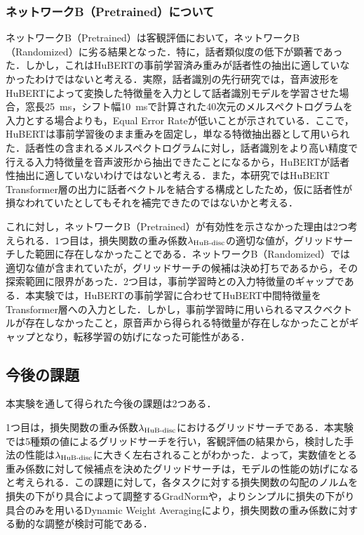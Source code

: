 \subsubsection{ネットワークB（Pretrained）について}
ネットワークB（Pretrained）は客観評価において，ネットワークB（Randomized）に劣る結果となった．特に，話者類似度の低下が顕著であった．しかし，これはHuBERTの事前学習済み重みが話者性の抽出に適していなかったわけではないと考える．実際，話者識別の先行研究\cite{chen2022large}では，音声波形をHuBERTによって変換した特徴量を入力として話者識別モデルを学習させた場合，窓長\SI{25}{\ms}，シフト幅\SI{10}{\ms}で計算された40次元のメルスペクトログラムを入力とする場合よりも，Equal Error Rateが低いことが示されている．ここで，HuBERTは事前学習後のまま重みを固定し，単なる特徴抽出器として用いられた．話者性の含まれるメルスペクトログラムに対し，話者識別をより高い精度で行える入力特徴量を音声波形から抽出できたことになるから，HuBERTが話者性抽出に適していないわけではないと考える．また，本研究ではHuBERT Transformer層の出力に話者ベクトルを結合する構成としたため，仮に話者性が損なわれていたとしてもそれを補完できたのではないかと考える．

これに対し，ネットワークB（Pretrained）が有効性を示さなかった理由は2つ考えられる．1つ目は，損失関数の重み係数$\lambda_{\text{HuB-disc}}$の適切な値が，グリッドサーチした範囲に存在しなかったことである．ネットワークB（Randomized）では適切な値が含まれていたが，グリッドサーチの候補は決め打ちであるから，その探索範囲に限界があった．2つ目は，事前学習時との入力特徴量のギャップである．本実験では，HuBERTの事前学習に合わせてHuBERT中間特徴量をTransformer層への入力とした．しかし，事前学習時に用いられるマスクベクトルが存在しなかったこと，原音声から得られる特徴量が存在しなかったことがギャップとなり，転移学習の妨げになった可能性がある．

\subsection{今後の課題}
本実験を通して得られた今後の課題は2つある．

1つ目は，損失関数の重み係数$\lambda_{\text{HuB-disc}}$におけるグリッドサーチである．本実験では5種類の値によるグリッドサーチを行い，客観評価の結果から，検討した手法の性能は$\lambda_{\text{HuB-disc}}$に大きく左右されることがわかった．よって，実数値をとる重み係数に対して候補点を決めたグリッドサーチは，モデルの性能の妨げになると考えられる．この課題に対して，各タスクに対する損失関数の勾配のノルムを損失の下がり具合によって調整するGradNorm\cite{chen2018gradnorm}や，よりシンプルに損失の下がり具合のみを用いるDynamic Weight Averaging\cite{liu2019end}により，損失関数の重み係数に対する動的な調整が検討可能である．


